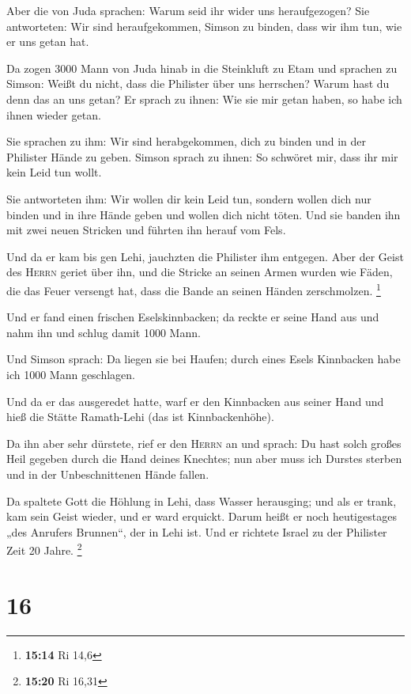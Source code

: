  Aber die von Juda sprachen: Warum seid ihr wider uns
heraufgezogen? Sie antworteten: Wir sind heraufgekommen, Simson zu
binden, dass wir ihm tun, wie er uns getan hat.

 Da zogen 3000 Mann von Juda hinab in die Steinkluft zu
Etam und sprachen zu Simson: Weißt du nicht, dass die Philister über uns
herrschen? Warum hast du denn das an uns getan? Er sprach zu ihnen: Wie
sie mir getan haben, so habe ich ihnen wieder getan.

 Sie sprachen zu ihm: Wir sind herabgekommen, dich zu
binden und in der Philister Hände zu geben. Simson sprach zu ihnen: So
schwöret mir, dass ihr mir kein Leid tun wollt.

 Sie antworteten ihm: Wir wollen dir kein Leid tun,
sondern wollen dich nur binden und in ihre Hände geben und wollen dich
nicht töten. Und sie banden ihn mit zwei neuen Stricken und führten ihn
herauf vom Fels.

 Und da er kam bis gen Lehi, jauchzten die Philister ihm
entgegen. Aber der Geist des \textsc{Herrn} geriet über ihn, und die
Stricke an seinen Armen wurden wie Fäden, die das Feuer versengt hat,
dass die Bande an seinen Händen zerschmolzen. \footnote{\textbf{15:14}
  Ri 14,6}

 Und er fand einen frischen Eselskinnbacken; da reckte er
seine Hand aus und nahm ihn und schlug damit 1000 Mann.

 Und Simson sprach: Da liegen sie bei Haufen; durch eines
Esels Kinnbacken habe ich 1000 Mann geschlagen.

 Und da er das ausgeredet hatte, warf er den Kinnbacken
aus seiner Hand und hieß die Stätte Ramath-Lehi (das ist
Kinnbackenhöhe).

 Da ihn aber sehr dürstete, rief er den \textsc{Herrn} an
und sprach: Du hast solch großes Heil gegeben durch die Hand deines
Knechtes; nun aber muss ich Durstes sterben und in der Unbeschnittenen
Hände fallen.

 Da spaltete Gott die Höhlung in Lehi, dass Wasser
herausging; und als er trank, kam sein Geist wieder, und er ward
erquickt. Darum heißt er noch heutigestages „des Anrufers Brunnen``, der
in Lehi ist.  Und er richtete Israel zu der Philister
Zeit 20 Jahre. \footnote{\textbf{15:20} Ri 16,31}

\hypertarget{section-7}{%
\section{16}\label{section-7}}

